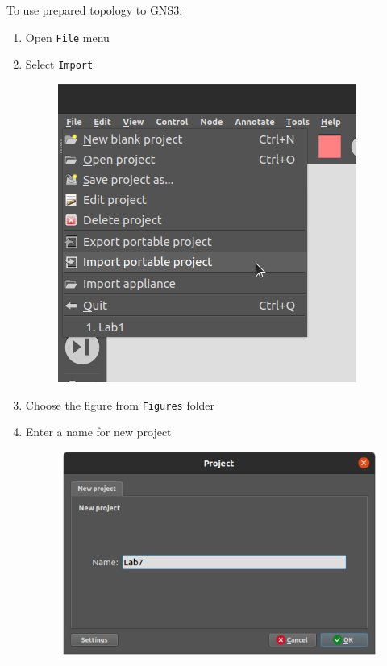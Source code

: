 \documentclass{../UTNetLab}
\begin{document}
To use prepared topology to GNS3:
\begin{enumerate}
    \item Open \texttt{File} menu
    \item Select \texttt{Import }
          \begin{figure}[H]
              \centering
              \includegraphics[scale=1.6]{img/import-1}
          \end{figure}
    \item Choose the figure from \texttt{Figures} folder
    \item Enter a name for new project
          \begin{figure}[H]
              \centering
              \includegraphics[scale=1.6]{img/import-2}
          \end{figure}
\end{enumerate}
\end{document}
